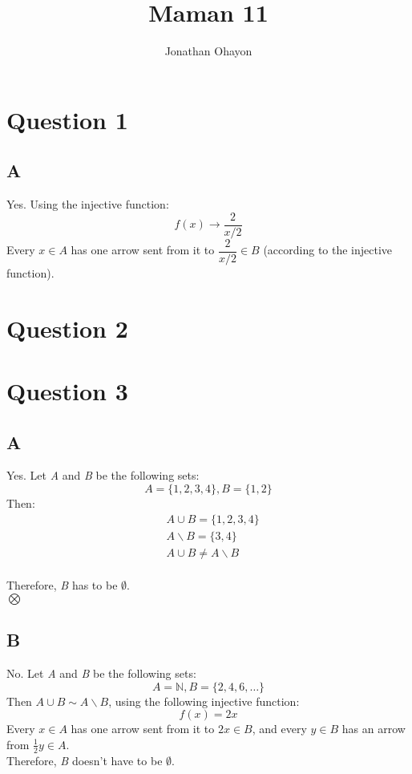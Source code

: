 \documentclass[12pt, oneside]{article}
\title{Maman 11}
\author{Jonathan Ohayon}
\begin{document}
\maketitle

\section{Question 1}
\subsection{A}
Yes. Using the injective function:
\begin{equation*}
f(x) \rightarrow \frac{2}{x/2}
\end{equation*}
Every $x \in A$ has one arrow sent from it to $\dfrac{2}{x/2} \in B$ (according to the injective function).

\section{Question 2}

\section{Question 3}
\subsection{A}
Yes. Let \emph{A} and \emph{B} be the following sets:
\begin{equation*}
A = \{1, 2, 3, 4\}, B = \{1, 2\}
\end{equation*}
Then:
\begin{equation*}
\begin{split}
& A \cup B = \{1, 2, 3, 4\}\\
& A \backslash B = \{3, 4\}\\
& A \cup B \neq A \backslash B
\end{split}
\end{equation*}\\
Therefore, \emph{B} has to be $\emptyset$.\\
$\bigotimes$

\subsection{B}
No. Let \emph{A} and \emph{B} be the following sets:
\begin{equation}
A = \mathbb{N}, B = \{2, 4, 6, \ldots\}
\end{equation}
Then $A \cup B \sim A \backslash B$, using the following injective function:
\begin{equation*}
f(x) = 2x
\end{equation*}
Every $x \in A$ has one arrow sent from it to $2x \in B$, and every $y \in B$ has an arrow from $\frac{1}{2}y \in A$.\\
Therefore, \emph{B} doesn't have to be $\emptyset$.
\end{document}
